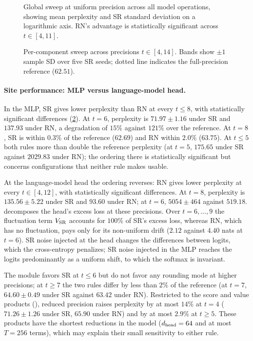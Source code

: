 \begin{figure}[t]
  \centering
  \caption{Global sweep at uniform precision across all model operations, showing mean perplexity and SR standard deviation on a logarithmic axis. RN's advantage is statistically significant across $t\in[4,11]$.}
  \label{fig:global}
\end{figure}

\begin{figure}[t]
  \centering
  \caption{Per-component sweep across precisions $t \in [4, 14]$. Bands show $\pm 1$ sample SD over five SR seeds; dotted line indicates the full-precision reference ($62.51$).}
  \label{fig:component}
\end{figure}

\paragraph{Site performance: MLP versus language-model head.}
In the MLP, SR gives lower perplexity than RN at every $t\le8$, with
statistically significant differences (\cref{fig:component}). At $t=6$,
perplexity is $71.97\pm1.16$ under SR and $137.93$ under RN, a degradation of
$15\%$ against $121\%$ over the reference. At $t=8$, SR is within $0.3\%$ of the
reference ($62.69$) and RN within $2.0\%$ ($63.75$). At $t\le5$ both rules more
than double the reference perplexity (at $t=5$, $175.65$ under SR against
$2029.83$ under RN); the ordering there is statistically significant but
concerns configurations that neither rule makes usable.

At the language-model head the ordering reverses: RN gives lower perplexity at
every $t\in[4,12]$, with statistically significant differences. At $t=8$,
perplexity is $135.56\pm5.22$ under SR and $93.60$ under RN; at $t=6$,
$5054\pm464$ against $519.18$.  decomposes
the head's excess loss at these precisions. Over $t=6,\ldots,9$ the fluctuation
term $V_{\mathrm{SR}}$ accounts for $100\%$ of SR's excess loss, whereas RN,
which has no fluctuation, pays only for its non-uniform drift ($2.12$ against
$4.40$ nats at $t=6$). SR noise injected at the head changes the differences
between logits, which the cross-entropy penalizes; SR noise injected in the MLP
reaches the logits predominantly as a uniform shift, to which the softmax is
invariant.

The  module favors SR at $t\le6$ but do not favor any rounding
mode at higher precisions; at $t\ge7$ the two rules differ by less than $2\%$ of
the reference (at $t=7$, $64.60\pm0.49$ under SR against $63.42$ under RN).
Restricted to the score and value products (), reduced
precision raises perplexity by at most $14\%$ at $t=4$ ($71.26\pm1.26$ under SR,
$65.90$ under RN) and by at most $2.9\%$ at $t\ge5$. These products have the
shortest reductions in the model ($d_{\rm head}=64$ and at most $T=256$ terms),
which may explain their small sensitivity to either rule.

